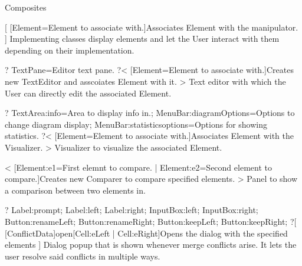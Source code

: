 \begin{package}{Composites}

    [
        [Element=Element to associate with.]{Associates Element with the manipulator.}
    ]{
        Implementing classes display elements and let the User interact with them depending on their implementation.
    }

    ?
        TextPane=Editor text pane.
    ?<
        [Element=Element to associate with.]{Creates new TextEditor and asscoiates Element with it.}
    >{
        Text editor with which the User can directly edit the associated Element.
    }

    ?
        TextArea:info=Area to display info in.;
        MenuBar:diagramOptions=Options to change diagram display;
        MenuBar:statisticsoptions=Options for showing statistics.
    ?<
        [Element=Element to associate with.]{Associates Element with the Visualizer.}
    >{
        Visualizer to visualize the associated Element.
    }

    <
        [Element:e1=First elemnt to compare. | Element:e2=Second element to compare.]{Creates new Comparer to compare specified elements.}
    >{
        Panel to show a comparison between two elements in.
    }

    ?
         Label:prompt;
        Label:left;
        Label:right;
        InputBox:left;
        InputBox:right;
        Button:renameLeft;
        Button:renameRight;
        Button:keepLeft;
        Button:keepRight;
    ?[
        \func{+}[ConflictData]{open}[Cell:eLeft | Cell:eRight]{Opens the dialog with the specified elements}
    ]{
        Dialog popup that is shown whenever merge conflicts arise. It lets the user resolve said conflicts in multiple ways.
    }
    
\end{package}